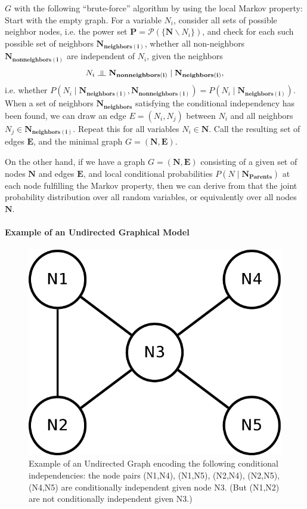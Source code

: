 $G$ with the following ``brute-force'' algorithm by using the local
Markov property: Start with the empty graph. For a variable $N_{i}$,
consider all sets of possible neighbor nodes, i.e. the power set $\mathbf{P}=\mathbb{\mathfrak{\mathcal{P}}}(\{\mathbf{N}\backslash N_{i}\})$,
and check for each such possible set of neighbors $\mathbf{N_{neighbors(i)}}$,
whether all non-neighbors $\mathbf{N_{nonneighbors(i)}}$ are independent
of $N_{i}$, given the neighbors
\[
N_{i}\,\mathbf{\,\indep\,\,N_{nonneighbors(i)}}\mid\mathbf{N_{neighbors(i)}},
\]
 i.e. whether $P(N_{i}\mid\mathbf{N_{neighbors(i)}},\mathbf{N_{nonneighbors(i)}})=P(N_{i}\mid\mathbf{N_{neighbors(i)}})$.
When a set of neighbors $\mathbf{N_{neighbors}}$ satisfying the conditional
independency has been found, we can draw an edge $E=(N_{i},N_{j})$
between $N_{i}$ and all neighbors $N_{j}\in\mathbf{N_{neighbors(i)}}$.
Repeat this for all variables $N_{i}\in\mathbf{N}$. Call the resulting
set of edges $\mathbf{E}$, and the minimal graph $G=(\mathbf{N},\mathbf{E})$.

On the other hand, if we have a graph $G=(\mathbf{N},\mathbf{E})$
consisting of a given set of nodes $\mathbf{N}$ and edges $\mathbf{E}$,
and local conditional probabilities $P(N\mid\mathbf{N}_{\mathbf{Parents}})$
at each node fulfilling the Markov property, then we can derive from
that the joint probability distribution over all random variables,
or equivalently over all nodes $\mathbf{N}$.

\paragraph{Example of an Undirected Graphical Model\label{par:Example-of-an-Undirected-Graphical-Model}}

\begin{figure}
\begin{centering}
\includegraphics[width=0.45\columnwidth]{images/undirected-graphical-model-example}
\par\end{centering}
\caption[Example of an Undirected Graph.]{\label{fig:Example-of-an-Undirected-Graph}Example of an Undirected
Graph encoding the following conditional independencies: the node
pairs (N1,N4), (N1,N5), (N2,N4), (N2,N5),(N4,N5) are conditionally
independent given node N3. (But (N1,N2) are not conditionally independent
given N3.)}
\end{figure}

